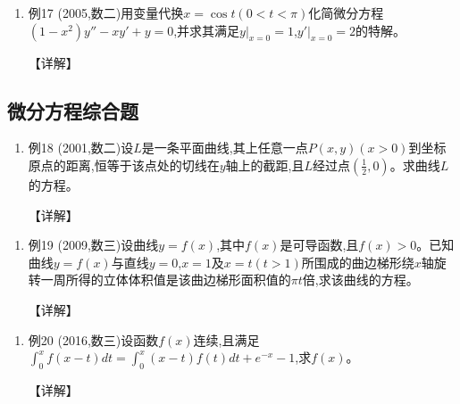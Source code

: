 \documentclass[12pt, a4paper, oneside, UTF8]{ctexbook}
\begin{document}
\begin{enumerate}[label=\arabic*.,start=17]
    \item 例17 (2005,数二)用变量代换$x=\cos t(0<t<\pi)$化简微分方程$(1-x^2)y''-xy'+y=0$,并求其满足$y|_{x=0}=1$,$y'|_{x=0}=2$的特解。
    
    \begin{solution}
    【详解】
    \end{solution}
\end{enumerate}

\subsection{ 微分方程综合题}

\begin{remark}
\end{remark}

\begin{enumerate}[label=\arabic*.,start=18]
    \item 例18 (2001,数二)设$L$是一条平面曲线,其上任意一点$P(x,y)(x>0)$到坐标原点的距离,恒等于该点处的切线在$y$轴上的截距,且$L$经过点$(\frac{1}{2},0)$。求曲线$L$的方程。
    
    \begin{solution}
    【详解】
    \end{solution}
\end{enumerate}

\begin{remark}
\end{remark}

\begin{enumerate}[label=\arabic*.,start=19]
    \item 例19 (2009,数三)设曲线$y=f(x)$,其中$f(x)$是可导函数,且$f(x)>0$。已知曲线$y=f(x)$与直线$y=0$,$x=1$及$x=t(t>1)$所围成的曲边梯形绕$x$轴旋转一周所得的立体体积值是该曲边梯形面积值的$\pi t$倍,求该曲线的方程。
    
    \begin{solution}
    【详解】
    \end{solution}
\end{enumerate}

\begin{remark}
\end{remark}

\begin{enumerate}[label=\arabic*.,start=20]
    \item 例20 (2016,数三)设函数$f(x)$连续,且满足$\int_0^x f(x-t)dt=\int_0^x(x-t)f(t)dt+e^{-x}-1$,求$f(x)$。
    
    \begin{solution}
    【详解】
    \end{solution}
\end{enumerate}
\end{document}
